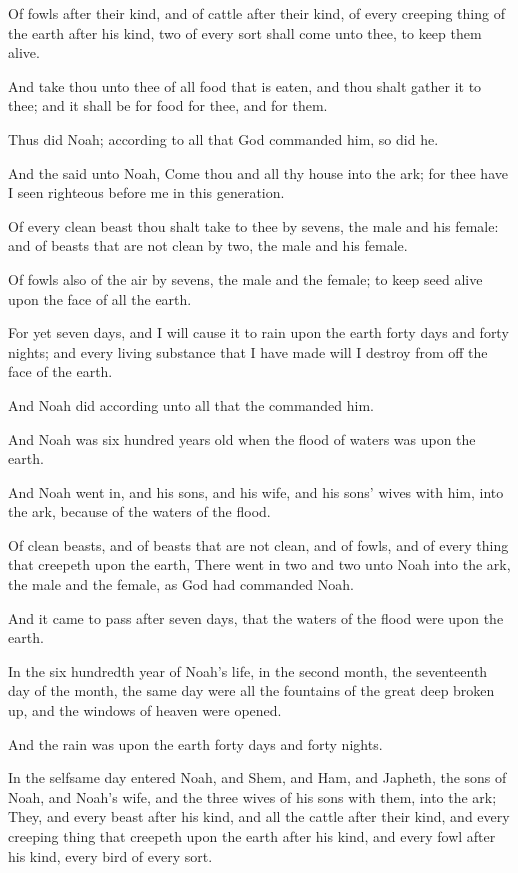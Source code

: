 \Verse Of fowls after their kind, and of cattle after their kind, of every creeping thing of the earth after his kind, two of every sort shall come unto thee, to keep them alive.

\Verse And take thou unto thee of all food that is eaten, and thou shalt gather it to thee; and it shall be for food for thee, and for them.

\Verse Thus did Noah; according to all that God commanded him, so did he.

\Chapter
\Verse And the \LORD said unto Noah, Come thou and all thy house into the ark; for thee have I seen righteous before me in this generation.

\Verse Of every clean beast thou shalt take to thee by sevens, the male and his female: and of beasts that are not clean by two, the male and his female.

\Verse Of fowls also of the air by sevens, the male and the female; to keep seed alive upon the face of all the earth.

\Verse For yet seven days, and I will cause it to rain upon the earth forty days and forty nights; and every living substance that I have made will I destroy from off the face of the earth.

\Verse And Noah did according unto all that the \LORD commanded him.

\Verse And Noah was six hundred years old when the flood of waters was upon the earth.

\Verse And Noah went in, and his sons, and his wife, and his sons' wives with him, into the ark, because of the waters of the flood.

\Verse Of clean beasts, and of beasts that are not clean, and of fowls, and of every thing that creepeth upon the earth, \Verse There went in two and two unto Noah into the ark, the male and the female, as God had commanded Noah.

\Verse And it came to pass after seven days, that the waters of the flood were upon the earth.

\Verse In the six hundredth year of Noah's life, in the second month, the seventeenth day of the month, the same day were all the fountains of the great deep broken up, and the windows of heaven were opened.

\Verse And the rain was upon the earth forty days and forty nights.

\Verse In the selfsame day entered Noah, and Shem, and Ham, and Japheth, the sons of Noah, and Noah's wife, and the three wives of his sons with them, into the ark; \Verse They, and every beast after his kind, and all the cattle after their kind, and every creeping thing that creepeth upon the earth after his kind, and every fowl after his kind, every bird of every sort.


